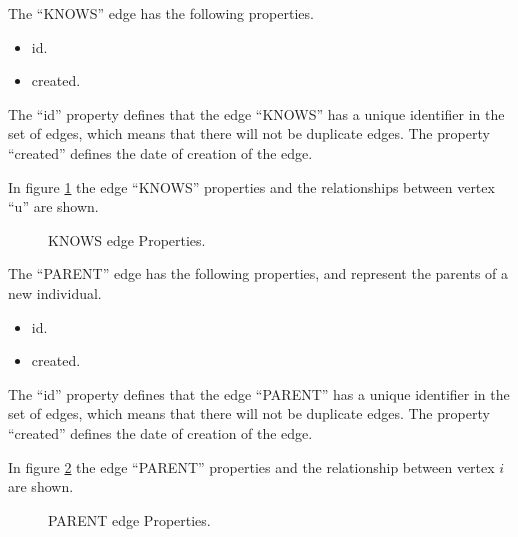 The “KNOWS” edge has the following properties.
\begin{itemize}
\item id.
\item created.
\end{itemize}

The “id” property defines that the edge “KNOWS” has a unique identifier in the
set of edges, which means that there will not be duplicate edges. The property
“created” defines the date of creation of the edge.

In figure \ref{fig:Knows_edge} the edge “KNOWS” properties and the relationships between vertex “u”
are shown.

\begin{figure}
\captionsetup{justification=centering,margin=2cm}
\centering
\setlength\fboxsep{0pt}
\setlength\fboxrule{0.7pt}
\caption{KNOWS edge Properties.}
\label{fig:Knows_edge}
\end{figure}

The “PARENT” edge has the following properties, and represent the parents of a
new individual.
\begin{itemize}
\item id.
\item created.
\end{itemize}

The “id” property defines that the edge “PARENT” has a unique identifier in the
set of edges, which means that there will not be duplicate edges. The property
“created” defines the date of creation of the edge.

In figure \ref{fig:Parent_edge} the edge “PARENT” properties and the
relationship between vertex $i$ are shown.

\begin{figure}
\captionsetup{justification=centering,margin=2cm}
\centering
\setlength\fboxsep{0pt}
\setlength\fboxrule{0.7pt}
\caption{PARENT edge Properties.}
\label{fig:Parent_edge}
\end{figure}

